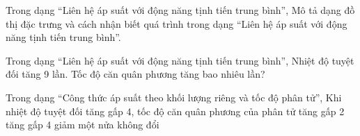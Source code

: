 \begin{ex}
Trong dạng “Liên hệ áp suất với động năng tịnh tiến trung bình”, Mô tả dạng đồ thị đặc trưng và cách nhận biết quá trình trong dạng “Liên hệ áp suất với động năng tịnh tiến trung bình”.
\choiceTF

\end{ex}

\begin{ex}
Trong dạng “Liên hệ áp suất với động năng tịnh tiến trung bình”, Nhiệt độ tuyệt đối tăng 9 lần. Tốc độ căn quân phương tăng bao nhiêu lần?
\end{ex}

\begin{ex}
Trong dạng “Công thức áp suất theo khối lượng riêng và tốc độ phân tử”, Khi nhiệt độ tuyệt đối tăng gấp 4, tốc độ căn quân phương của phân tử
\choice
{\True tăng gấp 2}
{tăng gấp 4}
{giảm một nửa}
{không đổi}
\end{ex}

